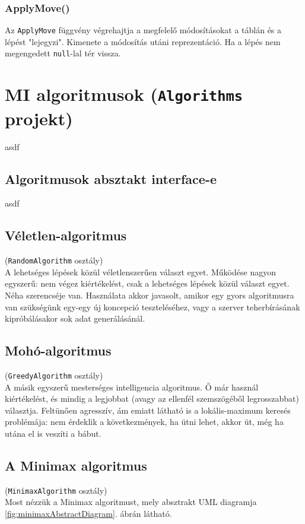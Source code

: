 \documentclass[twoside, a4paper, 12pt]{book}
\begin{document}
\subsubsection{ApplyMove()}
Az \texttt{ApplyMove} függvény végrehajtja a megfelelő módosításokat a táblán és a lépést "lejegyzi". Kimenete a módosítás utáni reprezentáció. Ha a lépés nem megengedett \texttt{null}-lal tér vissza.


\section{MI algoritmusok (\texttt{Algorithms} projekt)}
asdf
\subsection{Algoritmusok absztakt interface-e}
asdf
\subsection{Véletlen-algoritmus}
\noindent(\texttt{RandomAlgorithm} osztály) \\
A lehetséges lépések közül véletlenszerűen választ egyet. Működése nagyon egyszerű: nem végez kiértékelést, csak a lehetséges lépések közül választ egyet. Néha szerencséje van.
Használata akkor javasolt, amikor egy gyors algoritmusra van szükségünk egy-egy új koncepció teszteléséhez, vagy a szerver teherbírásának kipróbálásakor sok adat generálásánál.

\subsection{Mohó-algoritmus}
\noindent(\texttt{GreedyAlgorithm} osztály) \\
A másik egyszerű mesterséges intelligencia algoritmus. Ő már használ kiértékelést, és mindig a legjobbat (avagy az ellenfél szemszögéből legrosszabbat) választja. Feltünően agresszív, ám emiatt látható is a lokális-maximum keresés problémája: nem érdeklik a következmények, ha ütni lehet, akkor üt, még ha utána el is veszíti a bábut. 

\subsection{A Minimax algoritmus}
\noindent(\texttt{MinimaxAlgorithm} osztály) \\
Most nézzük a Minimax algoritmust, mely absztrakt UML diagramja \ref{fig:minimaxAbstractDiagram}. ábrán látható.
\end{document}
